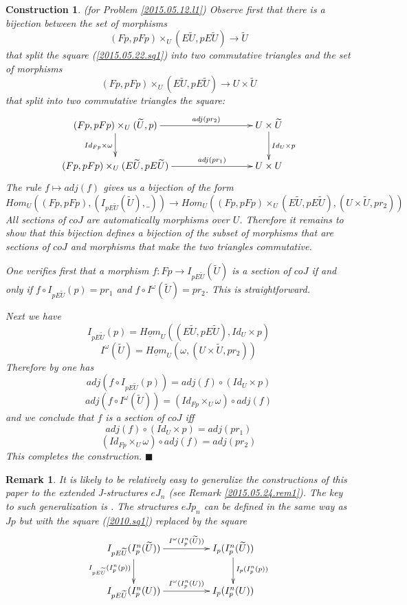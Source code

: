 \documentclass[12pt]{article}
\numberwithin{equation}{section}
\newenvironment{eq}{\begin{equation}}{\end{equation}}
\newtheorem{remark}[proposition]{Remark}
\newtheorem{construction0}[proposition]{Construction}
\newenvironment{construction}[1]{\begin{construction0}(for Problem \ref{#1})}{$\blacksquare$ \end{construction0}}
\newcommand{\llabel}[1]{\label{#1}}
\newcommand{\sr}{\rightarrow}
\newcommand{\uu}{\underline}
\newcommand{\wt}{\widetilde}
\begin{document}
%
\begin{construction}{2015.05.12.l1}\rm
\llabel{2015.05.22.constr1} Observe first that there is a bijection between the
set of morphisms
%
$$(Fp,pFp)\times_U(E\wt{U},pE\wt{U})\sr \wt{U}$$
%
that split the square (\ref{2015.05.22.sq1}) into two commutative triangles and
the set of morphisms
%
$$(Fp,pFp)\times_U(E\wt{U},pE\wt{U})\sr U\times\wt{U}$$
%
that split into two commutative triangles the square:
%
$$
\begin{xy}
          \xymatrix@C=7pc{ (Fp,pFp)\times_U(\wt{U},p) \ar[r]^-{adj(pr_2)}
            \ar[d]_{Id_{Fp}\times \omega} & U\times \wt{U} \ar[d]^{Id_U\times
              p}\\ (Fp,pFp)\times_U(E\wt{U},pE\wt{U}) \ar[r]^-{adj(pr_1)} &
            U\times U }
\end{xy}
$$
%
The rule $f\mapsto adj(f)$ gives us a bijection of the form
%
$$Hom_U((Fp,pFp),(I_{pE\wt{U}}(\wt{U}),\_))\sr Hom_U((Fp,pFp)\times_U
(E\wt{U},pE\wt{U}), (U\times\wt{U}, pr_2))$$
%
All sections of $coJ$ are automatically morphisms over $U$. Therefore it
remains to show that this bijection defines a bijection of the subset of
morphisms that are sections of $coJ$ and morphisms that make the two triangles
commutative.

One verifies first that a morphism $f:Fp\sr I_{pE\wt{U}}(\wt{U})$ is a section
of $coJ$ if and only if $f\circ I_{pE\wt{U}}(p)=pr_1$ and $f\circ
I^{\omega}(\wt{U})=pr_2$. This is straightforward.

Next we have
%
$$I_{pE\wt{U}}(p)=\uu{Hom}_U((E\wt{U},pE\wt{U}),Id_U\times p)$$
$$I^{\omega}(\wt{U})=\uu{Hom}_U(\omega,(U\times\wt{U},pr_2))$$
%
Therefore by \cite[Lemma 8.7]{fromunivwithPi} one has
%
$$adj(f\circ I_{pE\wt{U}}(p))=adj(f)\circ (Id_U\times p)$$
$$adj(f\circ I^{\omega}(\wt{U}))=(Id_{Fp}\times_{U}\omega)\circ adj(f)$$
%
and we conclude that $f$ is a section of $coJ$ iff
%
$$adj(f)\circ (Id_U\times p)=adj(pr_1)$$
$$(Id_{Fp}\times_{U}\omega)\circ adj(f)=adj(pr_2)$$
% 
This completes the construction.
\end{construction}
%
\begin{remark}\rm
\llabel{2015.05.24.rem2} It is likely to be relatively easy to generalize the
constructions of this paper to the extended J-structures $eJ_n$ (see Remark
\ref{2015.05.24.rem1}). The key to such generalization is \cite[Remark
  3.13]{fromunivwithPi}. The structures $eJp_n$ can be defined in the same way
as $Jp$ but with the square (\ref{2010.sq1}) replaced by the square
%
\begin{eq}
\llabel{2015.05.24.sq1}
\begin{xy}
          \xymatrix@C=4pc{ I_{pE\wt{U}}(I_p^n(\wt{U}))
            \ar[r]^-{I^{\omega}(I_p^n(\wt{U}))} \ar[d]_{I_{pE\wt{U}}(I_p^n(p))}
            & I_p(I_p^n(\wt{U}))
            \ar[d]^{I_p(I_p^n(p))}\\ I_{pE\wt{U}}(I_p^n(U))
            \ar[r]^-{I^{\omega}(I_p^n(U))} & I_p(I_p^n(U)) }
\end{xy}
\end{eq}
\end{remark}
%
\end{document}
